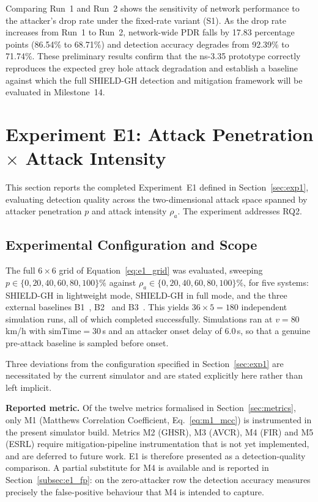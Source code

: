 \documentclass[12pt, a4paper]{report}
\newcommand{\mypar}{\vspace{0.8em}\noindent}
\begin{document}
Comparing Run~1 and Run~2 shows the sensitivity of network performance to the
attacker's drop rate under the fixed-rate variant (S1). As the drop rate increases
from Run~1 to Run~2, network-wide PDR falls by 17.83 percentage points (86.54\%
to 68.71\%) and detection accuracy degrades from 92.39\% to 71.74\%. These preliminary results confirm that the ns-3.35
prototype correctly reproduces the expected grey hole attack degradation and
establish a baseline against which the full SHIELD-GH detection and mitigation
framework will be evaluated in Milestone~14.

\section{Experiment E1: Attack Penetration $\times$ Attack Intensity}
\label{sec:e1_results}

This section reports the completed Experiment~E1 defined in
Section~\ref{sec:exp1}, evaluating detection quality across the
two-dimensional attack space spanned by attacker penetration $p$ and
attack intensity $\rho_a$. The experiment addresses RQ2.

\subsection{Experimental Configuration and Scope}
\label{subsec:e1_config}

The full $6\times6$ grid of Equation~\eqref{eq:e1_grid} was evaluated,
sweeping $p \in \{0,20,40,60,80,100\}\%$ against
$\rho_a \in \{0,20,40,60,80,100\}\%$, for five systems: SHIELD-GH in
lightweight mode, SHIELD-GH in full mode, and the three external
baselines B1~\cite{malik2023greyhole}, B2~\cite{alabdulatif2024mitigating}
and B3~\cite{ahsan2024flbert}. This yields $36 \times 5 = 180$
independent simulation runs, all of which completed successfully.
Simulations ran at $v=80$\,km/h with $\mathrm{simTime}=30$\,s and an
attacker onset delay of $6.0$\,s, so that a genuine pre-attack baseline
is sampled before onset.

Three deviations from the configuration specified in
Section~\ref{sec:exp1} are necessitated by the current simulator and are
stated explicitly here rather than left implicit.

\mypar
\textbf{Reported metric.}
Of the twelve metrics formalised in Section~\ref{sec:metrics}, only M1
(Matthews Correlation Coefficient, Eq.~\eqref{eq:m1_mcc}) is instrumented
in the present simulator build. Metrics M2 (GHSR), M3 (AVCR), M4 (FIR)
and M5 (ESRL) require mitigation-pipeline instrumentation that is not yet
implemented, and are deferred to future work. E1 is therefore presented
as a detection-quality comparison. A partial substitute for M4 is
available and is reported in Section~\ref{subsec:e1_fp}: on the
zero-attacker row the detection accuracy measures precisely the
false-positive behaviour that M4 is intended to capture.
\end{document}
